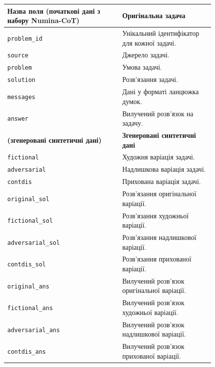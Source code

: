\begin{figure}[!ht]
    \small
    \centering
    \label{tab:dataset_final}
    \begin{tabular}{|p{4.5cm}|p{9cm}|}
        \hline
        \textbf{Назва поля (початкові дані з набору Numina-CoT)} & \textbf{Оригінальна задача} \\ \hline
        \texttt{problem\_id} & Унікальний ідентифікатор для кожної задачі. \\ \hline
        \texttt{source} & Джерело задачі. \\ \hline
        \texttt{problem} & Умова задачі. \\ \hline
        \texttt{solution} & Розв'язання задачі. \\ \hline
        \texttt{messages} & Дані у форматі ланцюжка думок. \\ \hline
        \texttt{answer} & Вилучений розв'язок на задачу. \\ \hline \hline
        \textbf{(згенеровані синтетичні дані)} & \textbf{Згенеровані синтетичні дані} \\ \hline
        \texttt{fictional} & Художня варіація задачі. \\ \hline
        \texttt{adversarial} & Надлишкова варіація задачі. \\ \hline
        \texttt{contdis} & Прихована варіація задачі. \\ \hline
        \texttt{original\_sol} & Розв'язання оригінальної варіації. \\ \hline
        \texttt{fictional\_sol} & Розв'язання художньої варіації. \\ \hline
        \texttt{adversarial\_sol} & Розв'язання надлишкової варіації. \\ \hline
        \texttt{contdis\_sol} & Розв'язання прихованої варіації. \\ \hline
        \texttt{original\_ans} & Вилучений розв'язок оригінальної варіації. \\ \hline
        \texttt{fictional\_ans} & Вилучений розв'язок художньої варіації. \\ \hline
        \texttt{adversarial\_ans} & Вилучений розв'язок надлишкової варіації. \\ \hline
        \texttt{contdis\_ans} & Вилучений розв'язок прихованої варіації. \\ \hline
    \end{tabular}
\end{figure}

